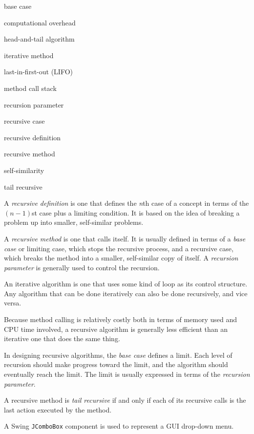 \pagebreak
{}
\label{chapter-summary}

\label{technical-terms}

\begin{KT}
base case

computational overhead

head-and-tail algorithm

iterative method

last-in-first-out (LIFO)

method call stack

recursion parameter

recursive case

recursive definition

recursive method

self-similarity

tail recursive

\end{KT}


\label{summaryof-important-points}

\begin{SMBL}
\item  A {\it recursive definition} is one that defines the
{\it n}th case of a concept in terms of the $(n-1)$st
case plus a limiting condition.   It is based on the idea of breaking a
problem up into smaller, self-similar problems.

\item  A {\it recursive method} is one that calls itself.
It is usually defined in terms of a {\it base case} or limiting case,
which stops the recursive process, and a recursive case, which breaks
the method into a smaller, self-similar copy of itself.   A {\it
recursion parameter} is generally used to control the recursion.

\item  An iterative algorithm is one that uses some kind of loop
as its control structure.  Any algorithm that can be done iteratively
can also be done recursively, and vice versa.


\item  Because method calling is relatively costly both in terms
of memory used and CPU time involved, a recursive algorithm
is generally less efficient than an iterative one that does the same
thing.

\item  In designing recursive algorithms, the {\it base case} defines
a limit.  Each level of recursion should make progress toward
the limit, and the algorithm should eventually reach the limit.
The limit is usually expressed in terms of the {\it recursion parameter}.

\item  A recursive method is {\it tail recursive} if and only if
each of its recursive calls is the last action executed by the
method.

\item  A Swing {\tt JComboBox} component is used to represent
a GUI drop-down menu.
\end{SMBL}


